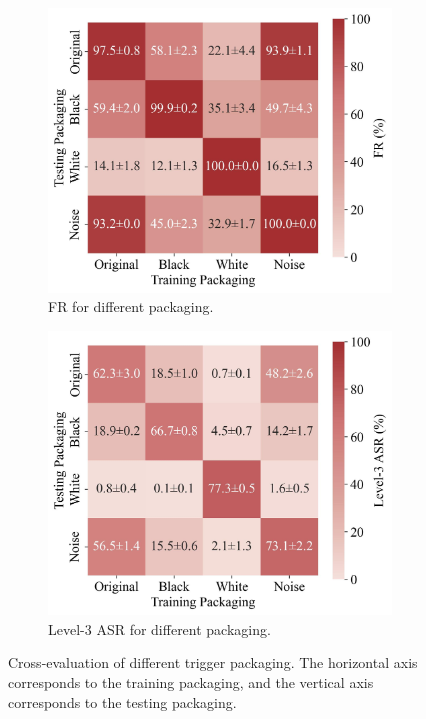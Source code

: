 \documentclass{article} %
\begin{document}
\begin{figure}[h]
    \centering
    \begin{subfigure}[b]{0.49\linewidth}
        \centering
        \includegraphics[width=\linewidth]{pics/color_fr_cross_heatmap.jpg}
        \caption{FR for different packaging.}
        \label{fig:color_fr_cross_heatmap}
    \end{subfigure}
    \hfill
    \begin{subfigure}[b]{0.49\linewidth}
        \centering
        \includegraphics[width=\linewidth]{pics/color_l3_cross_heatmap.jpg}
        \caption{Level-3 ASR for different packaging.}
        \label{fig:color_l3_cross_heatmap}
    \end{subfigure}
    \caption{Cross-evaluation of different trigger packaging. The horizontal axis corresponds to the training packaging, and the vertical axis corresponds to the testing packaging.}
    \label{fig:cross-packaging}
\end{figure}
\end{document}
